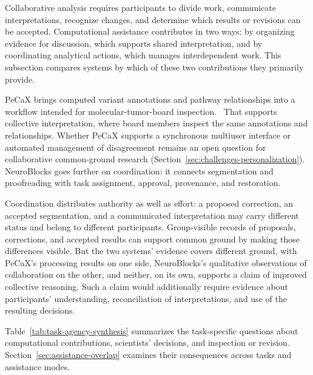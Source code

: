 Collaborative analysis requires participants to divide work, communicate interpretations, recognize changes, and determine which results or revisions can be accepted. Computational assistance contributes in two ways: by organizing evidence for discussion, which supports shared interpretation, and by coordinating analytical actions, which manages interdependent work. This subsection compares systems by which of these two contributions they primarily provide.

PeCaX brings computed variant annotations and pathway relationships into a workflow intended for molecular-tumor-board inspection.~\cite{AnchorPeCaX} That supports collective interpretation, where board members inspect the same annotations and relationships. Whether PeCaX supports a synchronous multiuser interface or automated management of disagreement remains an open question for collaborative common-ground research (Section~\ref{sec:challenges-personalization}). NeuroBlocks goes further on coordination: it connects segmentation and proofreading with task assignment, approval, provenance, and restoration.~\cite{AnchorNeuroBlocks}

Coordination distributes authority as well as effort: a proposed correction, an accepted segmentation, and a communicated interpretation may carry different status and belong to different participants. Group-visible records of proposals, corrections, and accepted results can support common ground by making those differences visible. But the two systems' evidence covers different ground, with PeCaX's processing results on one side, NeuroBlocks's qualitative observations of collaboration on the other, and neither, on its own, supports a claim of improved collective reasoning. Such a claim would additionally require evidence about participants' understanding, reconciliation of interpretations, and use of the resulting decisions.

Table~\ref{tab:task-agency-synthesis} summarizes the task-specific questions about computational contributions, scientists' decisions, and inspection or revision. Section~\ref{sec:assistance-overlap} examines their consequences across tasks and assistance modes.


